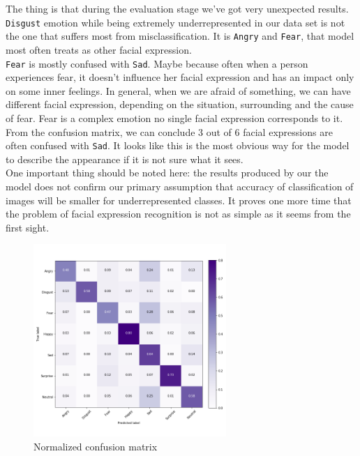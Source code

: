 The thing is that during the evaluation stage we've got very unexpected results. \texttt{Disgust} emotion while being extremely underrepresented in our data set is not the one that suffers most from misclassification. It is \texttt{Angry} and \texttt{Fear}, that model most often treats as other facial expression.\\

\texttt{Fear} is mostly confused with  \texttt{Sad}. Maybe because often when a person experiences fear, it doesn't influence her facial expression and has an impact only on some inner feelings. In general, when we are afraid of something, we can have different facial expression, depending on the situation, surrounding and the cause of fear. Fear is a complex emotion no single facial expression corresponds to it.\\

From the confusion matrix, we can conclude 3 out of 6 facial expressions are often confused with \texttt{Sad}. It looks like this is the most obvious way for the model to describe the appearance if it is not sure what it sees.\\

One important thing should be noted here: the results produced by our the model does not confirm our primary assumption that accuracy of classification of images will be smaller for underrepresented classes. It proves one more time that the problem of facial expression recognition is not as simple as it seems from the first sight.

\begin{figure}
	\centering
	\includegraphics[width=0.65\textwidth]{../images/confusion.png}
	\caption{Normalized confusion matrix}
\end{figure}


